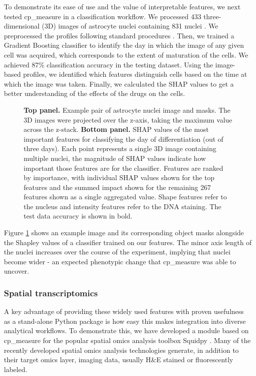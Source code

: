 \documentclass{article}
\begin{document}
To demonstrate its ease of use and the value of interpretable features, we next tested cp\_measure in a classification workflow. We processed 433 three-dimensional (3D) images of astrocyte nuclei containing 831 nuclei \citep{kalinin3DCellNuclear2018}. We preprocessed the profiles following standard procedures \citep{caicedoDataanalysisStrategiesImagebased2017}. Then, we trained a Gradient Boosting classifier to identify the day in which the image of any given cell was acquired, which corresponds to the extent of maturation of the cells. We achieved 87\% classification accuracy in the testing dataset. Using the image-based profiles, we identified which features distinguish cells based on the time at which the image was taken. Finally, we calculated the SHAP values \citep{sundararajanManyShapleyValues2020} to get a better understanding of the effects of the drugs on the cells.

\begin{figure}[htbp]
\centering

\caption{\label{fig:astrocytes}\textbf{Top panel.} Example pair of astrocyte nuclei image and masks. The 3D images were projected over the z-axis, taking the maximum value across the z-stack. \textbf{Bottom panel.} SHAP values of the most important features for classifying the day of differentiation (out of three days). Each point represents a single 3D image containing multiple nuclei, the magnitude of SHAP values indicate how important those features are for the classifier. Features are ranked by importance, with individual SHAP values shown for the top features and the summed impact shown for the remaining 267 features shown as a single aggregated value. Shape features refer to the nucleus and intensity features refer to the DNA staining. The test data accuracy is shown in bold.}
\end{figure}

Figure \ref{fig:astrocytes} shows an example image and its corresponding object masks alongside the Shapley values of a classifier trained on our features. The minor axis length of the nuclei increases over the course of the experiment, implying that nuclei become wider - an expected phenotypic change that cp\_measure was able to uncover.
\subsubsection{Spatial transcriptomics}
\label{sec:org5711d86}
A key advantage of providing these widely used features with proven usefulness as a stand-alone Python package is how easy this makes integration into diverse analytical workflows. To demonstrate this, we have developed a module based on cp\_measure for the popular spatial omics analysis toolbox Squidpy \citep{pallaSquidpyScalableFramework2022}.
Many of the recently developed spatial omics analysis technologies generate, in addition to their target omics layer, imaging data, usually H\&E stained or fluorescently labeled. 
\end{document}
